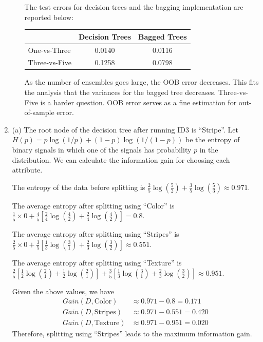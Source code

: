 \documentclass[10pt]{article}
\begin{document}
\begin{enumerate}
\begin{itemize}
        The test errors for decision trees and the bagging implementation are reported below:
        \begin{center}
        \begin{tabular}{l|c|c}
                & Decision Trees & Bagged Trees \\
            \hline
            One-vs-Three & 0.0140 & 0.0116 \\
            \hline
            Three-vs-Five & 0.1258 & 0.0798
          \end{tabular}
          \end{center}
    As the number of ensembles goes large, the OOB error decreases. This fits the analysis that the variances for the bagged tree decreases.  
    Three-vs-Five is a harder question.
    OOB error serves as a fine estimation for out-of-sample error.
  \end{itemize}



\item
 
(a) The root node of the decision tree after running ID3 is ``Stripe''. 
Let $H(p)= p\log(1/p) + (1-p)\log(1/(1-p))$ be the entropy of binary signals in which one of the signals has probability $p$ in the distribution. 
We can calculate the information gain for choosing each attribute. 

The entropy of the data before splitting is
$\frac{2}{5}\log\left(\frac{5}{2}\right)+\frac{3}{5}\log\left(\frac{5}{3}\right) \approx 0.971$.

The average entropy after splitting using ``Color'' is
$\frac{1}{5} \times 0 + \frac{4}{5} \left[ \frac{2}{4}\log\left(\frac{4}{2}\right) + \frac{2}{4}\log\left(\frac{4}{2}\right)\right] = 0.8$.

The average entropy after splitting using ``Stripes'' is
$\frac{2}{5} \times 0 + \frac{3}{5} \left[ \frac{1}{3}\log\left(\frac{3}{1}\right) + \frac{2}{3}\log\left(\frac{3}{2}\right)\right] \approx 0.551$.

The average entropy after splitting using ``Texture'' is
$\frac{2}{5} \left[\frac{1}{2}\log\left(\frac{2}{1}\right) + \frac{1}{2}\log\left(\frac{2}{1}\right)\right] + \frac{3}{5} \left[ \frac{1}{3}\log\left(\frac{3}{1}\right) + \frac{2}{3}\log\left(\frac{3}{2}\right)\right] \approx 0.951$.

Given the above values, we have
\begin{align*}
Gain(D,\mbox{Color}) &\approx 0.971 - 0.8 = 0.171 \\
Gain(D,\mbox{Stripes}) &\approx 0.971 - 0.551 = 0.420 \\ 
Gain(D,\mbox{Texture}) &\approx 0.971 - 0.951 = 0.020 
\end{align*}
Therefore, splitting using ``Stripes'' leads to the maximum information gain.


\end{enumerate}
\end{document}
